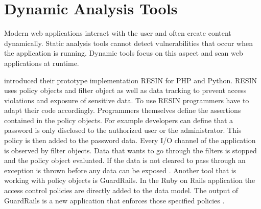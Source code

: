 

\section{Dynamic Analysis Tools}
Modern web applications interact with the user and often create content dynamically. Static analysis tools cannot detect vulnerabilities that occur when the application is running. Dynamic tools focus on this aspect and scan web applications at runtime.\newline


\textcite[]{Yip2009} introduced their prototype implementation RESIN for PHP and Python. RESIN uses policy objects and filter object as well as data tracking to prevent access violations and exposure of sensitive data. To use RESIN programmers have to adapt their code accordingly. Programmers themselves define the assertions contained in the policy objects. For example developers can define that a password is only disclosed to the authorized user or the administrator. This policy is then added to the password data. Every I/O channel of the application is observed by filter objects. Data that wants to go through the filters is stopped and the policy object evaluated. If the data is not cleared to pass through an exception is thrown before any data can be exposed \autocite[3-7]{Yip2009}. Another tool that is working with policy objects is GuardRails\autocite[]{Felt2011}. In the Ruby on Rails application the access control policies are directly added to the data model. The output of GuardRails is a new application that enforces those specified policies \autocite[2-4]{Felt2011}.\newline


